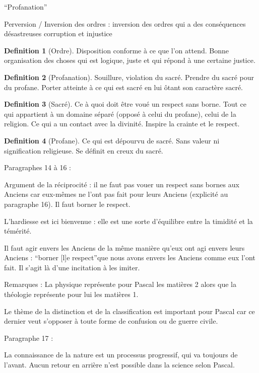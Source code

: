\documentclass[french]{book}
\theoremstyle{definition}
\newtheorem*{dfn}{Definition}
\begin{document}
“Profanation”


Perversion / Inversion des ordres :
inversion des ordres qui a des conséquences désastreuses
corruption et injustice

\begin{dfn}[Ordre]
Disposition conforme à ce que l'on attend. Bonne organisation des choses qui est logique, juste et qui répond à une certaine justice.
\end{dfn}

\begin{dfn}[Profanation]
Souillure, violation du sacré. Prendre du sacré pour du profane. Porter atteinte à ce qui est sacré en lui ôtant son caractère sacré.
\end{dfn}

\begin{dfn}[Sacré]
Ce à quoi doit être voué un respect sans borne. Tout ce qui appartient à un domaine séparé (opposé à celui du profane), celui de la religion. Ce qui a un contact avec la divinité. Inspire la crainte et le respect.
\end{dfn}

\begin{dfn}[Profane]
Ce qui est dépourvu de sacré. Sans valeur ni signification religieuse. Se définit en creux du sacré.
\end{dfn}

Paragraphes 14 à 16 :

Argument de la réciprocité : il ne faut pas vouer un respect sans bornes aux Anciens car eux-mêmes ne l’ont pas fait pour leurs Anciens (explicité au paragraphe 16). Il faut borner le respect.

L’hardiesse est ici bienvenue : elle est une sorte d’équilibre entre la timidité et la témérité.

Il faut agir envers les Anciens de la même manière qu’eux ont agi envers leurs Anciens : “borner [l]e respect”que nous avons envers les Anciens comme eux l’ont fait. Il s’agit là d’une incitation à les imiter.

Remarques :
La physique représente pour Pascal les matières 2 alors que la théologie représente pour lui les matières 1.

Le thème de la distinction et de la classification est important pour Pascal car ce dernier veut s’opposer à toute forme de confusion ou de guerre civile.

Paragraphe 17 :

La connaissance de la nature est un processus progressif, qui va toujours de l’avant. Aucun retour en arrière n’est possible dans la science selon Pascal.
\end{document}

